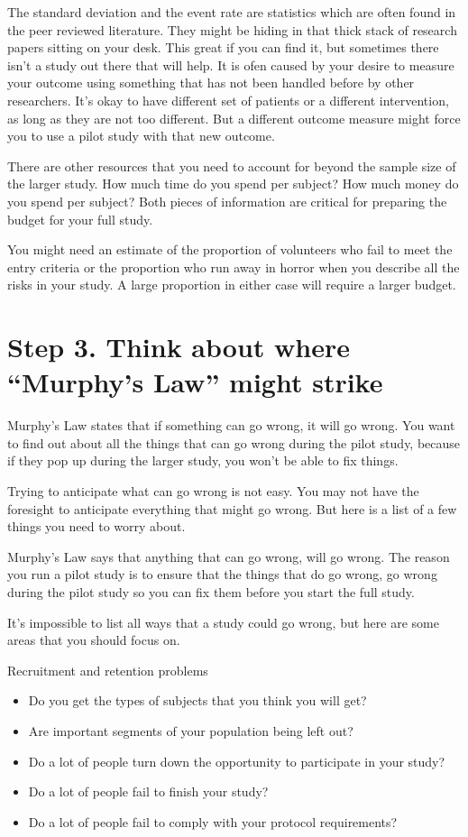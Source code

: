 \documentclass[
  letterpaper,
  DIV=11,
  numbers=noendperiod]{scrreprt}
\providecommand{\tightlist}{%
  \setlength{\itemsep}{0pt}\setlength{\parskip}{0pt}}
\begin{document}
The standard deviation and the event rate are statistics which are often
found in the peer reviewed literature. They might be hiding in that
thick stack of research papers sitting on your desk. This great if you
can find it, but sometimes there isn't a study out there that will help.
It is ofen caused by your desire to measure your outcome using something
that has not been handled before by other researchers. It's okay to have
different set of patients or a different intervention, as long as they
are not too different. But a different outcome measure might force you
to use a pilot study with that new outcome.

There are other resources that you need to account for beyond the sample
size of the larger study. How much time do you spend per subject? How
much money do you spend per subject? Both pieces of information are
critical for preparing the budget for your full study.

You might need an estimate of the proportion of volunteers who fail to
meet the entry criteria or the proportion who run away in horror when
you describe all the risks in your study. A large proportion in either
case will require a larger budget.

\section{Step 3. Think about where ``Murphy's Law'' might
strike}\label{step-3.-think-about-where-murphys-law-might-strike}

Murphy's Law states that if something can go wrong, it will go wrong.
You want to find out about all the things that can go wrong during the
pilot study, because if they pop up during the larger study, you won't
be able to fix things.

Trying to anticipate what can go wrong is not easy. You may not have the
foresight to anticipate everything that might go wrong. But here is a
list of a few things you need to worry about.

Murphy's Law says that anything that can go wrong, will go wrong. The
reason you run a pilot study is to ensure that the things that do go
wrong, go wrong during the pilot study so you can fix them before you
start the full study.

It's impossible to list all ways that a study could go wrong, but here
are some areas that you should focus on.

Recruitment and retention problems

\begin{itemize}
\tightlist
\item
  Do you get the types of subjects that you think you will get?
\item
  Are important segments of your population being left out?
\item
  Do a lot of people turn down the opportunity to participate in your
  study?
\item
  Do a lot of people fail to finish your study?
\item
  Do a lot of people fail to comply with your protocol requirements?
\end{itemize}
\end{document}
